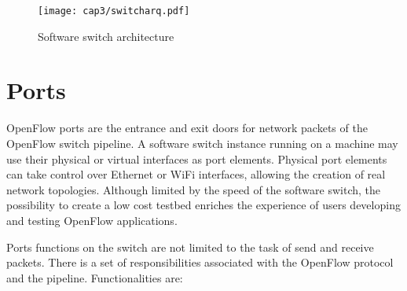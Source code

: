 \begin{figure}[H]
\centering
\texttt{[image: cap3/switcharq.pdf]}
\caption{Software switch architecture}
\label{fig:switcharq}
\end{figure}

	\section{Ports}

	OpenFlow ports are the entrance and exit doors for  network packets of the OpenFlow switch pipeline. A software switch instance running on a machine may use their physical or virtual interfaces as port elements. Physical port elements can take control over Ethernet or WiFi interfaces, allowing the creation of real network topologies. Although limited by the speed of the software switch, the possibility to create a low cost testbed enriches the experience of users developing and testing OpenFlow applications.     

	Ports functions on the switch are not limited to the task of send and receive packets. There is a set of responsibilities associated with the OpenFlow protocol and the pipeline. Functionalities are:

